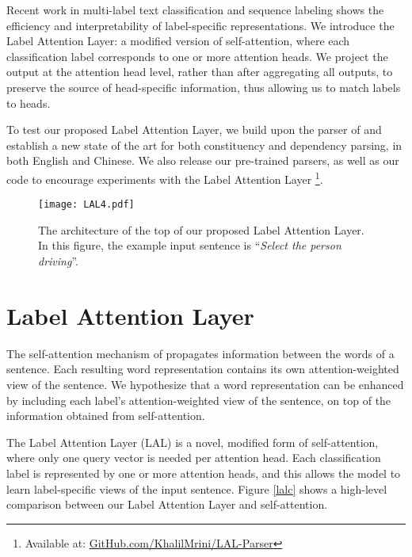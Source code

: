 \documentclass[11pt,a4paper]{article}
\begin{document}
Recent work in multi-label text classification \cite{xiao2019label} and sequence labeling \cite{cui2019hierarchically} shows the efficiency and interpretability of label-specific representations. We introduce the Label Attention Layer: a modified version of self-attention, where each classification label corresponds to one or more attention heads. We project the output at the attention head level, rather than after aggregating all outputs, to preserve the source of head-specific information, thus allowing us to match labels to heads.


To test our proposed Label Attention Layer, we build upon the parser of \citet{zhou2019head} and establish a new state of the art for both constituency and dependency parsing, in both English and Chinese. We also release our pre-trained parsers, as well as our code to encourage experiments with the Label Attention Layer
\footnote{Available at: \href{http://www.github.com/KhalilMrini/LAL-Parser}{GitHub.com/KhalilMrini/LAL-Parser}}.



\begin{figure*}
    \centering 
    \texttt{[image: LAL4.pdf]}
    \caption{The architecture of the top of our proposed Label Attention Layer. In this figure, the example input sentence is ``\textit{Select the person driving}''.}
    \label{lal4}
\end{figure*}

\section{Label Attention Layer}
\label{section_lal}

The self-attention mechanism of \citet{vaswani2017attention} propagates information between the words of a sentence. Each resulting word representation contains its own attention-weighted view of the sentence. We hypothesize that a word representation can be enhanced by including each label's attention-weighted view of the sentence, on top of the information obtained from self-attention.
 
The Label Attention Layer (LAL) is a novel, modified form of self-attention, where only one query vector is needed per attention head. Each classification label is represented by one or more attention heads, and this allows the model to learn label-specific views of the input sentence. Figure \ref{lalc} shows a high-level comparison between our Label Attention Layer and self-attention.
\end{document}
